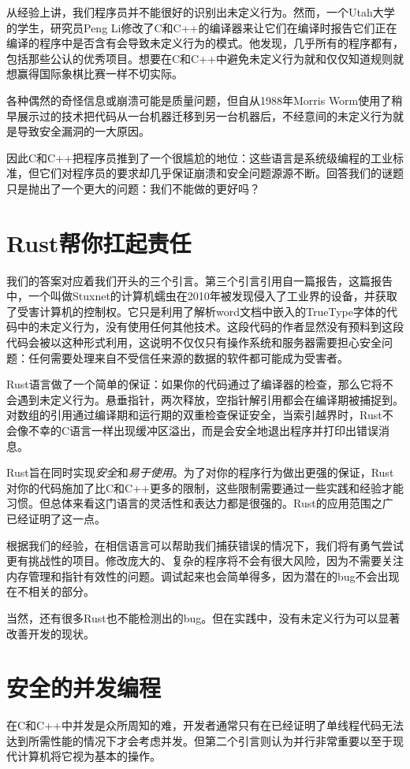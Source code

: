 从经验上讲，我们程序员并不能很好的识别出未定义行为。然而，一个Utah大学的学生，研究员Peng Li修改了C和C++的编译器来让它们在编译时报告它们正在编译的程序中是否含有会导致未定义行为的模式。他发现，几乎所有的程序都有，包括那些公认的优秀项目。想要在C和C++中避免未定义行为就和仅仅知道规则就想赢得国际象棋比赛一样不切实际。

各种偶然的奇怪信息或崩溃可能是质量问题，但自从1988年Morris Worm使用了稍早展示过的技术把代码从一台机器迁移到另一台机器后，不经意间的未定义行为就是导致安全漏洞的一大原因。

因此C和C++把程序员推到了一个很尴尬的地位：这些语言是系统级编程的工业标准，但它们对程序员的要求却几乎保证崩溃和安全问题源源不断。回答我们的谜题只是抛出了一个更大的问题：我们不能做的更好吗？

\section{Rust帮你扛起责任}
我们的答案对应着我们开头的三个引言。第三个引言引用自一篇报告，这篇报告中，一个叫做Stuxnet的计算机蠕虫在2010年被发现侵入了工业界的设备，并获取了受害计算机的控制权。它只是利用了解析word文档中嵌入的TrueType字体的代码中的未定义行为，没有使用任何其他技术。这段代码的作者显然没有预料到这段代码会被以这种形式利用，这说明不仅仅只有操作系统和服务器需要担心安全问题：任何需要处理来自不受信任来源的数据的软件都可能成为受害者。

Rust语言做了一个简单的保证：如果你的代码通过了编译器的检查，那么它将不会遇到未定义行为。悬垂指针，两次释放，空指针解引用都会在编译期被捕捉到。对数组的引用通过编译期和运行期的双重检查保证安全，当索引越界时，Rust不会像不幸的C语言一样出现缓冲区溢出，而是会安全地退出程序并打印出错误消息。

Rust旨在同时实现\emph{安全}和\emph{易于使用}。为了对你的程序行为做出更强的保证，Rust对你的代码施加了比C和C++更多的限制，这些限制需要通过一些实践和经验才能习惯。但总体来看这门语言的灵活性和表达力都是很强的。Rust的应用范围之广已经证明了这一点。

根据我们的经验，在相信语言可以帮助我们捕获错误的情况下，我们将有勇气尝试更有挑战性的项目。修改庞大的、复杂的程序将不会有很大风险，因为不需要关注内存管理和指针有效性的问题。调试起来也会简单得多，因为潜在的bug不会出现在不相关的部分。

当然，还有很多Rust也不能检测出的bug。但在实践中，没有未定义行为可以显著改善开发的现状。

\section{安全的并发编程}
在C和C++中并发是众所周知的难，开发者通常只有在已经证明了单线程代码无法达到所需性能的情况下才会考虑并发。但第二个引言则认为并行非常重要以至于现代计算机将它视为基本的操作。

